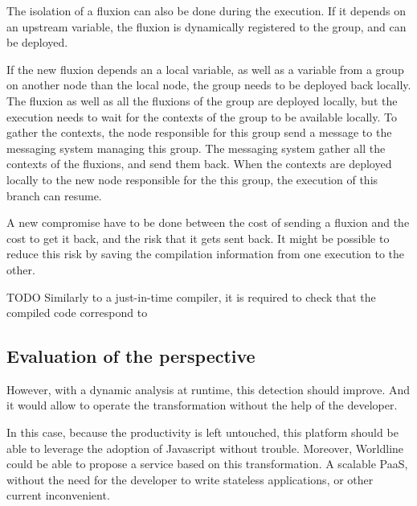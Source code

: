 The isolation of a fluxion can also be done during the execution.
If it depends on an upstream variable, the fluxion is dynamically registered to the group, and can be deployed.

If the new fluxion depends an a local variable, as well as a variable from a group on another node than the local node, the group needs to be deployed back locally.
The fluxion as well as all the fluxions of the group are deployed locally, but the execution needs to wait for the contexts of the group to be available locally.
To gather the contexts, the node responsible for this group send a message to the messaging system managing this group.
The messaging system gather all the contexts of the fluxions, and send them back.
When the contexts are deployed locally to the new node responsible for the this group, the execution of this branch can resume.

A new compromise have to be done between the cost of sending a fluxion and the cost to get it back, and the risk that it gets sent back.
It might be possible to reduce this risk by saving the compilation information from one execution to the other.


TODO
Similarly to a just-in-time compiler, it is required to check that the compiled code correspond to 


\subsection{Evaluation of the perspective}

However, with a dynamic analysis at runtime, this detection should improve.
And it would allow to operate the transformation without the help of the developer.

In this case, because the productivity is left untouched, this platform should be able to leverage the adoption of Javascript without trouble.
Moreover, Worldline could be able to propose a service based on this transformation.
A scalable PaaS, without the need for the developer to write stateless applications, or other current inconvenient.
